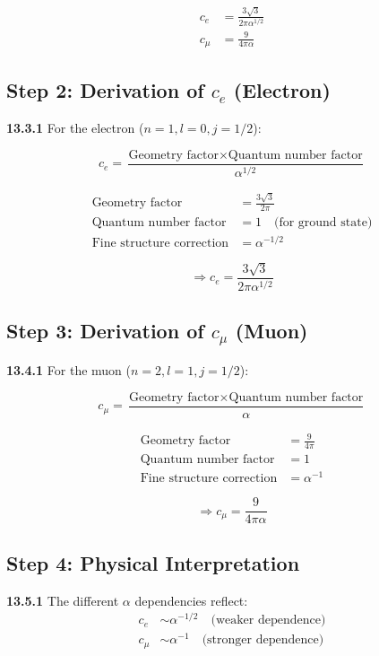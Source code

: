 \documentclass[12pt,a4paper]{article}
\begin{document}
\begin{align*}
	c_e &= \frac{3\sqrt{3}}{2\pi\alpha^{1/2}} \\
	c_\mu &= \frac{9}{4\pi\alpha}
\end{align*}

\subsection{Step 2: Derivation of $c_e$ (Electron)}

\noindent \textbf{13.3.1} For the electron ($n=1, l=0, j=1/2$):

\[
c_e = \frac{\text{Geometry factor} \times \text{Quantum number factor}}{\alpha^{1/2}}
\]

\begin{align*}
	\text{Geometry factor} &= \frac{3\sqrt{3}}{2\pi} \\
	\text{Quantum number factor} &= 1 \quad \text{(for ground state)} \\
	\text{Fine structure correction} &= \alpha^{-1/2}
\end{align*}

\[
\Rightarrow c_e = \frac{3\sqrt{3}}{2\pi\alpha^{1/2}}
\]

\subsection{Step 3: Derivation of $c_\mu$ (Muon)}

\noindent \textbf{13.4.1} For the muon ($n=2, l=1, j=1/2$):

\[
c_\mu = \frac{\text{Geometry factor} \times \text{Quantum number factor}}{\alpha}
\]

\begin{align*}
	\text{Geometry factor} &= \frac{9}{4\pi} \\
	\text{Quantum number factor} &= 1 \\
	\text{Fine structure correction} &= \alpha^{-1}
\end{align*}

\[
\Rightarrow c_\mu = \frac{9}{4\pi\alpha}
\]

\subsection{Step 4: Physical Interpretation}

\noindent \textbf{13.5.1} The different $\alpha$ dependencies reflect:
\begin{align*}
	c_e &\sim \alpha^{-1/2} \quad \text{(weaker dependence)} \\
	c_\mu &\sim \alpha^{-1} \quad \text{(stronger dependence)}
\end{align*}
\end{document}
